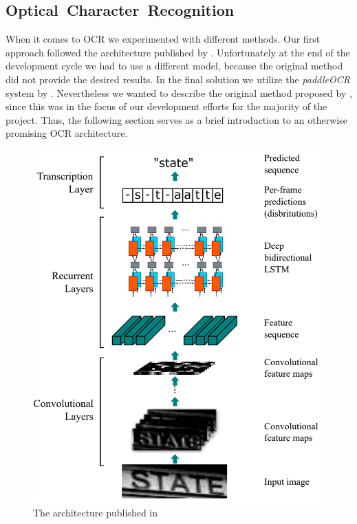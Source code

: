\subsection{Optical~Character~Recognition}
\label{subsec:ocr}

When it comes to \ac{OCR} we experimented with different methods. Our first
approach followed the architecture published by \cite{7801919}.  Unfortunately
at the end of the development cycle we had to use a different model, because the
original method did not provide the desired results.  In the final solution we
utilize the \emph{paddleOCR} system by \cite{DBLP:journals/corr/abs-2009-09941}.
Nevertheless we wanted to describe the original method proposed by
\cite{7801919}, since this was in the focus of our development efforts for the
majority of the project. Thus, the following section serves as a brief
introduction to an otherwise promising \ac{OCR} architecture.

\begin{figure}
	\includegraphics[width=\textwidth]{figures/crnn.png}
	\caption{The architecture published in \cite{7801919}}
	\label{fig:ocr_architecture}
\end{figure}

